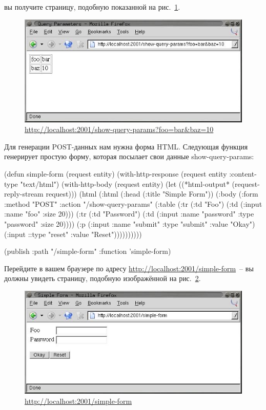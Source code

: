 \noindent{}вы получите страницу, подобную показанной на рис.~\ref{fig:26-4}.

\begin{figure}[htb]
  \centering
  \includegraphics[scale=0.7]{images/show-query-params-1a.jpg}
  \caption{\url{http://localhost:2001/show-query-params?foo=bar&baz=10}}
  \label{fig:26-4}
\end{figure}

Для генерации POST-данных нам нужна форма HTML. Следующая функция генерирует простую
форму, которая посылает свои данные show-query-params:

\begin{myverb}
(defun simple-form (request entity)
  (with-http-response (request entity :content-type "text/html")
    (with-http-body (request entity)
      (let ((*html-output* (request-reply-stream request)))
        (html
          (:html
            (:head (:title "Simple Form"))
            (:body
             (:form :method "POST" :action "/show-query-params"
               (:table
                (:tr (:td "Foo")
                     (:td (:input :name "foo" :size 20)))
                (:tr (:td "Password")
                     (:td (:input :name "password" :type "password" :size 20))))
               (:p (:input :name "submit" :type "submit" :value "Okay")
                   (:input ::type "reset" :value "Reset"))))))))))

(publish :path "/simple-form" :function 'simple-form)
\end{myverb}

Перейдите в вашем браузере по адресу \url{http://localhost:2001/simple-form}~-- вы должны
увидеть страницу, подобную изображённой на рис.~\ref{fig:26-5}.

\begin{figure}[htb]
  \centering
  \includegraphics[scale=0.7]{images/simple-form.jpg}
  \caption{\url{http://localhost:2001/simple-form}}
  \label{fig:26-5}
\end{figure}

